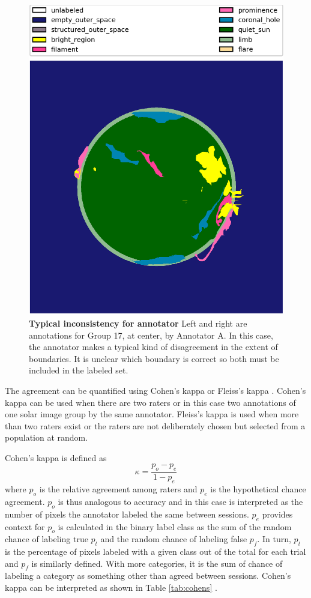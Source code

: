 \documentclass[twoside]{report}
\begin{document}
\begin{figure}[H]
\begin{center}
    \includegraphics[scale=0.1]{g20171102000206-1}
    \caption{{\bf Typical inconsistency for annotator} Left and right are annotations for Group 17, at center, by Annotator A. In this case, the annotator makes a typical kind of disagreement in the extent of boundaries. It is unclear which boundary is correct so both must be included in the labeled set.} 
    \label{fig:annotatorconsistency2}
 \end{center}
\end{figure}

The agreement can be quantified using Cohen's kappa or Fleiss's kappa \cite{landiskoch}. Cohen's kappa can be used when there are two raters or in this case two annotations of one solar image group by the same annotator. Fleiss's kappa is used when more than two raters exist or the raters are not deliberately chosen but selected from a population at random. 

Cohen's kappa is defined as 
\[\kappa = \frac{p_o - p_e}{1-p_e} \] where $p_o$ is the relative agreement among raters and $p_e$ is the hypothetical chance agreement. $p_o$ is thus analogous to accuracy and in this case is interpreted as the number of pixels the annotator labeled the same between sessions. $p_e$ provides context for $p_o$ is calculated in the binary label class as the sum of the random chance of labeling true $p_t$ and the random chance of labeling false $p_f$. In turn, $p_t$ is the percentage of pixels labeled with a given class out of the total for each trial and $p_f$ is similarly defined. With more categories, it is the sum of chance of labeling a category as something other than agreed between sessions. Cohen's kappa can be interpreted as shown in Table \ref{tab:cohens} \cite{cohens}.
\end{document}
